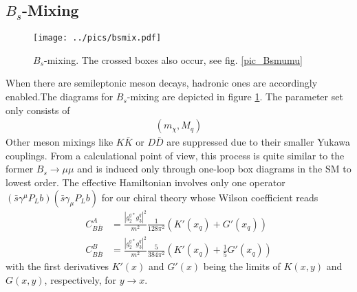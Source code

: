 \subsection{$B_s$-Mixing}
\begin{figure}[t]
 \texttt{[image: ../pics/bsmix.pdf]}
 \caption{$B_s$-mixing. The crossed boxes also occur, see fig. \ref{pic_Bsmumu}}
 \label{pic_Bsmix}
\end{figure}
When there are semileptonic meson decays, hadronic ones are accordingly enabled.The diagrams for $B_s$-mixing are depicted in figure \ref{pic_Bsmix}. 
The parameter set only consists of
\begin{align}
 \left(m_\chi,M_q\right)
\end{align}
Other
meson mixings like $K\bar K$ or $ D \bar D$ are suppressed due to their smaller Yukawa couplings. From a calculational point of view, this process is 
quite similar to the former $B_s\rightarrow \mu\mu$ and is induced only through one-loop box diagrams in the SM to lowest order. The effective Hamiltonian
involves only one operator $(\bar s \gamma^\mu P_L b)(\bar s \gamma_\mu P_L b)$ for our chiral theory whose Wilson coefficient reads
\begin{align}
 C_{B\bar B}^A &=  \frac{|g_2^{q*}g_3^q|^2}{m^2} \frac{1}{128\pi^2} \left(K'(x_q) + G'(x_q)\right)\\
 C_{B\bar B}^B &=  \frac{|g_2^{q*}g_3^q|^2}{m^2} \frac{5}{384\pi^2} \left(K'(x_q) + \frac15 G'(x_q)\right)
\end{align}
with the first derivatives $K'(x)$ and $G'(x)$ being the limits of $K(x,y)$ and $G(x,y)$, respectively, for $y\rightarrow x$. 

